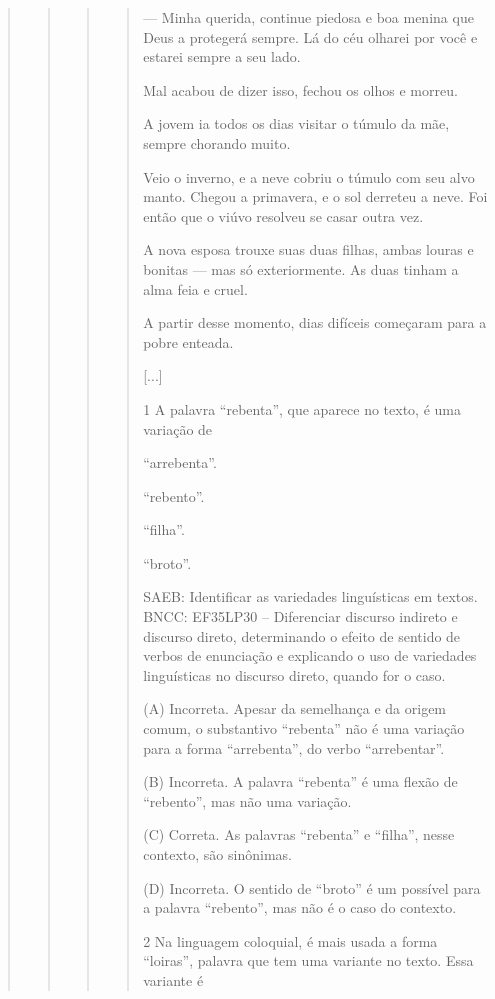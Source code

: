 \begin{boxlist}
{{\begin{quote}
\begin{quote}
\begin{quote}
{\begin{quote}
--- Minha querida, continue piedosa e boa menina que
Deus a protegerá sempre. Lá do céu olharei por você e estarei
sempre a seu lado.

Mal acabou de dizer isso, fechou os olhos e morreu.

A jovem ia todos os dias visitar o túmulo da mãe,
sempre chorando muito.

Veio o inverno, e a neve cobriu o túmulo com seu alvo
manto. Chegou a primavera, e o sol derreteu a neve. Foi então
que o viúvo resolveu se casar outra vez.

A nova esposa trouxe suas duas filhas, ambas louras e
bonitas --- mas só exteriormente. As duas tinham a alma feia
e cruel.

A partir desse momento, dias difíceis começaram para
a pobre enteada.

{[}...{]}


\num{1} A palavra ``rebenta'', que aparece no texto, é uma variação de

\begin{escolha}
\item ``arrebenta''.
\item ``rebento''.
\item ``filha''.
\item ``broto''.
\end{escolha}

SAEB: Identificar as variedades linguísticas em textos.
BNCC: EF35LP30 -- Diferenciar discurso indireto e discurso direto,
determinando o efeito de sentido de verbos de enunciação e explicando o
uso de variedades linguísticas no discurso direto, quando for o caso.

(A) Incorreta. Apesar da semelhança e da origem comum, o substantivo ``rebenta'' não é uma variação para a forma ``arrebenta'', do verbo ``arrebentar''.

(B) Incorreta. A palavra ``rebenta'' é uma flexão de ``rebento'', mas não uma variação.

(C) Correta. As palavras ``rebenta'' e ``filha'', nesse contexto, são sinônimas.

(D) Incorreta. O sentido de ``broto'' é um possível para a palavra ``rebento'', mas não é o caso do contexto.

\num{2} Na linguagem coloquial, é mais usada a forma ``loiras'', palavra que tem uma variante no texto. Essa variante é


\end{quote}}
\end{quote}
\end{quote}
\end{quote}}}
\end{boxlist}
